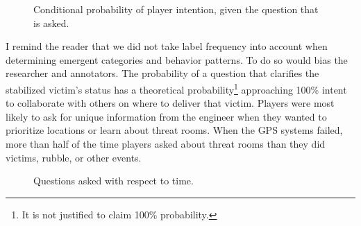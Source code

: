 \begin{figure}[h!]
    \centering
    \caption{ Conditional probability of player intention, given the question that is asked.}
\end{figure}



I remind the reader that we did not take label frequency into account when determining emergent categories and behavior patterns. To do so would bias the researcher and annotators. The probability of a question that clarifies the stabilized victim's status has a theoretical probability\footnote{It is not justified to claim 100\% probability.} approaching 100\% intent to collaborate with others on where to deliver that victim. Players were most likely to ask for unique information from the engineer when they wanted to prioritize locations or learn about threat rooms. When the GPS systems failed, more than half of the time players asked about threat rooms than they did victims, rubble, or other events.





\clearpage
\begin{figure}[h!]
    \centering
    \caption{Questions asked with respect to time.}
    \end{figure}
    
